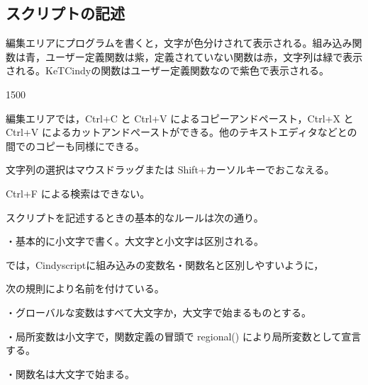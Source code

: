 \documentclass[papersize,a4paper,12pt,uplatex]{jsarticle}
\begin{document}
\subsection{スクリプトの記述}
編集エリアにプログラムを書くと，文字が色分けされて表示される。組み込み関数は青，ユーザー定義関数は紫，定義されていない関数は赤，文字列は緑で表示される。KeTCindyの関数はユーザー定義関数なので紫色で表示される。

\begin{layer}{150}{0}
\end{layer}
\vspace{45mm}

編集エリアでは，Ctrl+C と Ctrl+V によるコピーアンドペースト，Ctrl+X と Ctrl+V によるカットアンドぺーストができる。他のテキストエディタなどとの間でのコピーも同様にできる。

文字列の選択はマウスドラッグまたは Shift+カーソルキーでおこなえる。

Ctrl+F による検索はできない。

スクリプトを記述するときの基本的なルールは次の通り。

\vspace{\baselineskip}
・基本的に小文字で書く。大文字と小文字は区別される。

\hspace{5mm}\ketcindy では，Cindyscriptに組み込みの変数名・関数名と区別しやすいように，

\hspace{5mm}次の規則により名前を付けている。

\hspace{5mm}・グローバルな変数はすべて大文字か，大文字で始まるものとする。

\hspace{5mm}・局所変数は小文字で，関数定義の冒頭で regional() により局所変数として宣言する。

\hspace{5mm}・関数名は大文字で始まる。
\end{document}
